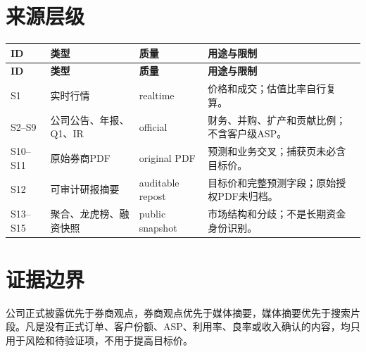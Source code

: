
\section{来源层级}
\begin{longtable}{L{1.2cm}L{3.2cm}L{3.0cm}L{4.5cm}}
\textbf{ID} & \textbf{类型} & \textbf{质量} & \textbf{用途与限制} \\
\endfirsthead
\textbf{ID} & \textbf{类型} & \textbf{质量} & \textbf{用途与限制} \\
\endhead
S1 & 实时行情 & realtime & 价格和成交；估值比率自行复算。\\
S2--S9 & 公司公告、年报、Q1、IR & official & 财务、并购、扩产和贡献比例；不含客户级ASP。\\
S10--S11 & 原始券商PDF & original PDF & 预测和业务交叉；捕获页未必含目标价。\\
S12 & 可审计研报摘要 & auditable repost & 目标价和完整预测字段；原始授权PDF未归档。\\
S13--S15 & 聚合、龙虎榜、融资快照 & public snapshot & 市场结构和分歧；不是长期资金身份识别。\\
\end{longtable}

\section{证据边界}
公司正式披露优先于券商观点，券商观点优先于媒体摘要，媒体摘要优先于搜索片段。凡是没有正式订单、客户份额、ASP、利用率、良率或收入确认的内容，均只用于风险和待验证项，不用于提高目标价。
